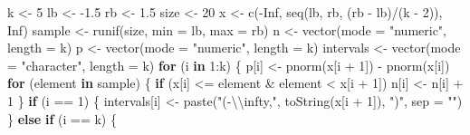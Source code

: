 \documentclass[
]{article}
\newenvironment{Shaded}{\begin{snugshade}}{\end{snugshade}}
\newcommand{\AttributeTok}[1]{\textcolor[rgb]{0.77,0.63,0.00}{#1}}
\newcommand{\ConstantTok}[1]{\textcolor[rgb]{0.00,0.00,0.00}{#1}}
\newcommand{\ControlFlowTok}[1]{\textcolor[rgb]{0.13,0.29,0.53}{\textbf{#1}}}
\newcommand{\DecValTok}[1]{\textcolor[rgb]{0.00,0.00,0.81}{#1}}
\newcommand{\FloatTok}[1]{\textcolor[rgb]{0.00,0.00,0.81}{#1}}
\newcommand{\FunctionTok}[1]{\textcolor[rgb]{0.00,0.00,0.00}{#1}}
\newcommand{\NormalTok}[1]{#1}
\newcommand{\OtherTok}[1]{\textcolor[rgb]{0.56,0.35,0.01}{#1}}
\newcommand{\SpecialCharTok}[1]{\textcolor[rgb]{0.00,0.00,0.00}{#1}}
\newcommand{\StringTok}[1]{\textcolor[rgb]{0.31,0.60,0.02}{#1}}
\begin{document}
\begin{Shaded}
\begin{Highlighting}[]
\NormalTok{k }\OtherTok{\textless{}{-}} \DecValTok{5}
\NormalTok{lb }\OtherTok{\textless{}{-}} \SpecialCharTok{{-}}\FloatTok{1.5}
\NormalTok{rb }\OtherTok{\textless{}{-}} \FloatTok{1.5}
\NormalTok{size }\OtherTok{\textless{}{-}} \DecValTok{20}
\NormalTok{x }\OtherTok{\textless{}{-}} \FunctionTok{c}\NormalTok{(}\SpecialCharTok{{-}}\ConstantTok{Inf}\NormalTok{, }\FunctionTok{seq}\NormalTok{(lb, rb, (rb }\SpecialCharTok{{-}}\NormalTok{ lb)}\SpecialCharTok{/}\NormalTok{(k }\SpecialCharTok{{-}} \DecValTok{2}\NormalTok{)), }\ConstantTok{Inf}\NormalTok{)}
\NormalTok{sample }\OtherTok{\textless{}{-}} \FunctionTok{runif}\NormalTok{(size, }\AttributeTok{min =}\NormalTok{ lb, }\AttributeTok{max =}\NormalTok{ rb)}
\NormalTok{n }\OtherTok{\textless{}{-}} \FunctionTok{vector}\NormalTok{(}\AttributeTok{mode =} \StringTok{"numeric"}\NormalTok{, }\AttributeTok{length =}\NormalTok{ k)}
\NormalTok{p }\OtherTok{\textless{}{-}} \FunctionTok{vector}\NormalTok{(}\AttributeTok{mode =} \StringTok{"numeric"}\NormalTok{, }\AttributeTok{length =}\NormalTok{ k)}
\NormalTok{intervals }\OtherTok{\textless{}{-}} \FunctionTok{vector}\NormalTok{(}\AttributeTok{mode =} \StringTok{"character"}\NormalTok{, }\AttributeTok{length =}\NormalTok{ k)}
\ControlFlowTok{for}\NormalTok{ (i }\ControlFlowTok{in} \DecValTok{1}\SpecialCharTok{:}\NormalTok{k) \{}
\NormalTok{    p[i] }\OtherTok{\textless{}{-}} \FunctionTok{pnorm}\NormalTok{(x[i }\SpecialCharTok{+} \DecValTok{1}\NormalTok{]) }\SpecialCharTok{{-}} \FunctionTok{pnorm}\NormalTok{(x[i])}
    \ControlFlowTok{for}\NormalTok{ (element }\ControlFlowTok{in}\NormalTok{ sample) \{}
        \ControlFlowTok{if}\NormalTok{ (x[i] }\SpecialCharTok{\textless{}=}\NormalTok{ element }\SpecialCharTok{\&}\NormalTok{ element }\SpecialCharTok{\textless{}}\NormalTok{ x[i }\SpecialCharTok{+} \DecValTok{1}\NormalTok{]) }
\NormalTok{            n[i] }\OtherTok{\textless{}{-}}\NormalTok{ n[i] }\SpecialCharTok{+} \DecValTok{1}
\NormalTok{    \}}
    \ControlFlowTok{if}\NormalTok{ (i }\SpecialCharTok{==} \DecValTok{1}\NormalTok{) \{}
\NormalTok{        intervals[i] }\OtherTok{\textless{}{-}} \FunctionTok{paste}\NormalTok{(}\StringTok{"({-}}\SpecialCharTok{\textbackslash{}\textbackslash{}}\StringTok{infty,"}\NormalTok{, }\FunctionTok{toString}\NormalTok{(x[i }\SpecialCharTok{+} \DecValTok{1}\NormalTok{]), }\StringTok{")"}\NormalTok{, }\AttributeTok{sep =} \StringTok{""}\NormalTok{)}
\NormalTok{    \} }\ControlFlowTok{else} \ControlFlowTok{if}\NormalTok{ (i }\SpecialCharTok{==}\NormalTok{ k) \{}

\end{Highlighting}
\end{Shaded}
\end{document}
